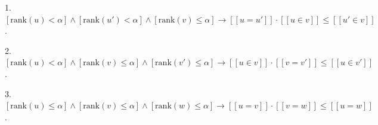 1. $[\text{rank}(u) < \alpha] \wedge [\text{rank}(u') < \alpha] \wedge [\text{rank}(v) \leq \alpha] \rightarrow [[u = u']] \cdot [[u \in v]] \leq [[u' \in v]]$.

2. $[\text{rank}(u) < \alpha] \wedge [\text{rank}(v) \leq \alpha] \wedge [\text{rank}(v') \leq \alpha] \rightarrow [[u \in v]] \cdot [[v = v']] \leq [[u \in v']]$.

3. $[\text{rank}(u) \leq \alpha] \wedge [\text{rank}(v) \leq \alpha] \wedge [\text{rank}(w) \leq \alpha] \rightarrow [[u = v]] \cdot [[v = w]] \leq [[u = w]]$.
